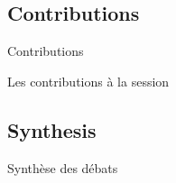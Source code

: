 \subsection*{Contributions}{Contributions}

Les contributions à la session 





\subsection*{Synthesis}{Synthèse des débats}









\stars

\newpage

















